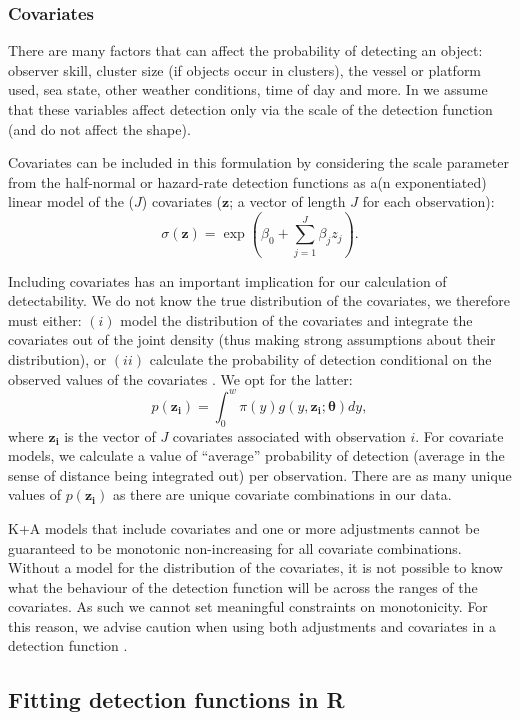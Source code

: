 \documentclass[article]{jss}
\begin{document}
\subsubsection{Covariates}

There are many factors that can affect the probability of detecting an object: observer skill, cluster size (if objects occur in clusters), the vessel or platform used, sea state, other weather conditions, time of day and more. In  we assume that these variables affect detection only via the scale of the detection function (and do not affect the shape).

Covariates can be included in this formulation by considering the scale parameter from the half-normal or hazard-rate detection functions as a(n exponentiated) linear model of the ($J$) covariates ($\mathbf{z}$; a vector of length $J$ for each observation):
$$
\sigma(\mathbf{z}) = \exp(\beta_0 + \sum_{j=1}^J \beta_j z_j).
$$

Including covariates has an important implication for our calculation of detectability. We do not know the true distribution of the covariates, we therefore must either: $(i)$ model the distribution of the covariates and integrate the covariates out of the joint density (thus making strong assumptions about their distribution), or $(ii)$ calculate the probability of detection conditional on the observed values of the covariates \citep{Marques:2003vb}. We opt for the latter:
$$
p(\mathbf{z_i}) = \int_0^w \pi(y) g(y, \mathbf{z_i}; \boldsymbol{\theta}) dy,
$$
where $\mathbf{z_i}$ is the vector of $J$ covariates associated with observation $i$. For covariate models, we calculate a value of ``average'' probability of detection (average in the sense of distance being integrated out) per observation. There are as many unique values of $p(\mathbf{z_i})$ as there are unique covariate combinations in our data.

K+A models that include covariates and one or more adjustments cannot be guaranteed to be monotonic non-increasing for all covariate combinations. Without a model for the distribution of the covariates, it is not possible to know what the behaviour of the detection function will be across the ranges of the covariates. As such we cannot set meaningful constraints on monotonicity. For this reason, we advise caution when using both adjustments and covariates in a detection function \citep[see][for an example of when this can be problematic]{Miller:2015hw}.


\subsection{Fitting detection functions in R}
\end{document}
